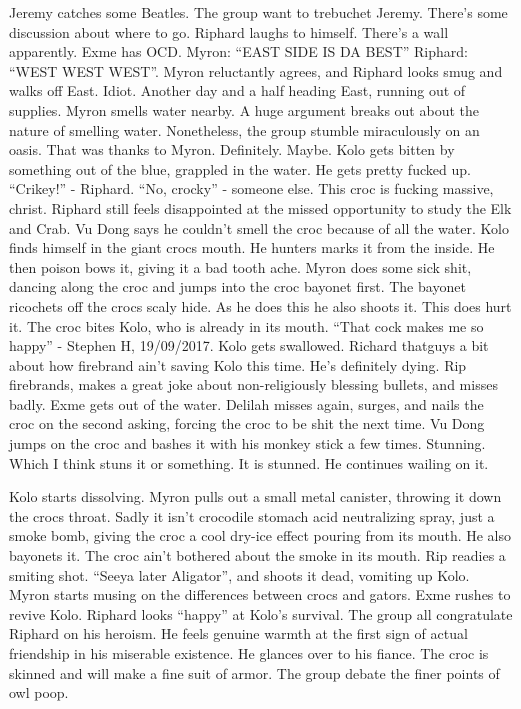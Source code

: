 \begin{multicols}{2}
Jeremy catches some Beatles. The group want to trebuchet Jeremy. There’s some discussion about where to go. Riphard laughs to himself. There’s a wall apparently. Exme has OCD. Myron: “EAST SIDE IS DA BEST” Riphard: “WEST WEST WEST”. Myron reluctantly agrees, and Riphard looks smug and walks off East. Idiot. Another day and a half heading East, running out of supplies. Myron smells water nearby. A huge argument breaks out about the nature of smelling water. Nonetheless, the group stumble miraculously on an oasis. That was thanks to Myron. Definitely. Maybe. Kolo gets bitten by something out of the blue, grappled in the water. He gets pretty fucked up. “Crikey!” - Riphard.  “No, crocky” - someone else. This croc is fucking massive, christ. Riphard still feels disappointed at the missed opportunity to study the Elk and Crab. Vu Dong says he couldn’t smell the croc because of all the water. Kolo finds himself in the giant crocs mouth. He hunters marks it from the inside. He then poison bows it, giving it a bad tooth ache. Myron does some sick shit, dancing along the croc and jumps into the croc bayonet first. The bayonet ricochets off the crocs scaly hide. As he does this he also shoots it. This does hurt it. The croc bites Kolo, who is already in its mouth. “That cock makes me so happy” - Stephen H, 19/09/2017. Kolo gets swallowed. Richard thatguys a bit about how firebrand ain’t saving Kolo this time. He’s definitely dying. Rip firebrands, makes a great joke about non-religiously blessing bullets, and misses badly. Exme gets out of the water. Delilah misses again, surges, and nails the croc on the second asking, forcing the croc to be shit the next time. Vu Dong jumps on the croc and bashes it with his monkey stick a few times. Stunning. Which I think stuns it or something. It is stunned. He continues wailing on it.\medskip

Kolo starts dissolving. Myron pulls out a small metal canister, throwing it down the crocs throat. Sadly it isn’t crocodile stomach acid neutralizing spray, just a smoke bomb, giving the croc a cool dry-ice effect pouring from its mouth. He also bayonets it. The croc ain’t bothered about the smoke in its mouth. Rip readies a smiting shot. “Seeya later Aligator”, and shoots it dead, vomiting up Kolo. Myron starts musing on the differences between crocs and gators. Exme rushes to revive Kolo. Riphard looks “happy” at Kolo’s survival. The group all congratulate Riphard on his heroism. He feels genuine warmth at the first sign of actual friendship in his miserable existence. He glances over to his fiance. The croc is skinned and will make a fine suit of armor. The group debate the finer points of owl poop. \medskip


\end{multicols}
